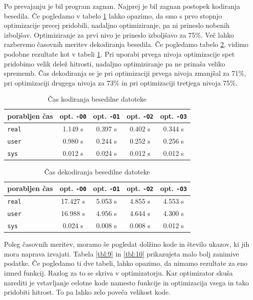\documentclass[a4paper, 12pt]{book}
\begin{document}
Po prevajanju je bil program zagnan. Najprej je bil zagnan postopek kodiranja besedila. Če pogledamo v tabelo \ref{tbl:6} lahko opazimo, da smo s prvo stopnjo optimizacije precej pridobili, nadaljno optimiziranje, pa ni prineslo nobenih izboljšav. Optimiziranje za prvi nivo je prineslo izboljšavo za 75\%. Več lahko razberemo časovnih meritev dekodiranja besedila. Če pogledamo tabelo \ref{tbl:7}, vidimo podobne rezultate kot v tabeli \ref{tbl:6}. Pri uporabi prvega nivoja optimizacije spet pridobimo velik delež hitrosti, nadaljno optimiziranje pa ne prinaša veliko sprememb. Čas dekodiranja se je pri optimizaciji prvega nivoja zmanjšal za 71\%, pri optimizaciji drugega nivoja za 73\% in pri optimizaciji tretjega nivoja 75\%.

\begin{table}
	\begin{center}
		\begin{tabular}{l|cccc}
			porabljen čas & opt. {\tt -O0} & opt. {\tt -O1} & opt. {\tt -O2} & opt. {\tt -O3} \\ \hline
			{\tt real} & 1.149 s & 0.397 s & 0.402 s & 0.344 s \\
			{\tt user} & 0.980 s & 0.244 s & 0.252 s & 0.256 s \\
			{\tt sys}  & 0.012 s & 0.024 s & 0.012 s & 0.012 s
		\end{tabular}
	\end{center}
	\caption{Čas kodiranja besedilne datoteke}
	\label{tbl:6}
\end{table}

\begin{table}
	\begin{center}
		\begin{tabular}{l|cccc}
			porabljen čas & opt. {\tt -O0} & opt. {\tt -O1} & opt. {\tt -O2} & opt. {\tt -O3} \\ \hline
			{\tt real} & 17.427 s & 5.053 s & 4.855 s & 4.553 s \\
			{\tt user} & 16.988 s & 4.956 s & 4.644 s & 4.300 s \\
			{\tt sys}  & 0.024 s & 0.008 s & 0.008 s & 0.012 s
		\end{tabular}
	\end{center}
	\caption{Čas dekodiranja besedilne datoteke}
	\label{tbl:7}
\end{table}

Poleg časovnih meritev, moramo še pogledat dolžino kode in število ukazov, ki jih mora naprava izvajati. Tabela \ref{tbl:9} in \ref{tbl:10} prikazujeta malo bolj zanimive podatke. Če pogledamo ti dve tabeli, lahko opazimo, da nimamo rezultate za eno izmed funkcij. Razlog za to se skriva v optimizatorju. Kar optimizator skuša narediti je vstavljanje celotne kode namesto funkcije in optimizacija vsega in tako pridobiti hitrost. To pa lahko zelo poveča velikost kode.
\end{document}
